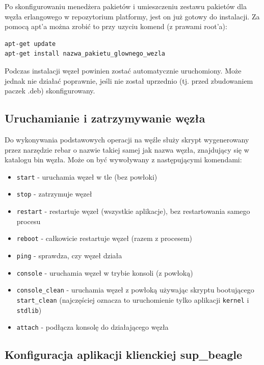 \documentclass[polish,12pt]{aghthesis}
\begin{document}
Po skonfigurowaniu menedżera pakietów i umieszczeniu zestawu pakietów dla węzła erlangowego w repozytorium platformy, jest on już gotowy do instalacji. Za pomocą apt'a można zrobić to przy uzyciu komend (z prawami root'a):

\begin{verbatim}
apt-get update
apt-get install nazwa_pakietu_glownego_wezla
\end{verbatim}
Podczas instalacji węzeł powinien zostać automatycznie uruchomiony. Może jednak nie działać poprawnie, jeśli nie został uprzednio (tj. przed zbudowaniem paczek .deb) skonfigurowany.

\subsection{Uruchamianie i zatrzymywanie węzła}

Do wykonywania podstawowych operacji na węźle służy skrypt wygenerowany przez narzędzie rebar o nazwie takiej samej jak nazwa węzła, znajdujący się w katalogu bin węzła. Może on być wywoływany z następującymi komendami:
\begin{itemize}
\item \texttt{start} - uruchamia węzeł w tle (bez powłoki)
\item \texttt{stop} - zatrzymuje węzeł
\item \texttt{restart} - restartuje węzeł (wszystkie aplikacje), bez restartowania samego procesu
\item \texttt{reboot} - całkowicie restartuje węzeł (razem z procesem)
\item \texttt{ping} - sprawdza, czy węzeł działa
\item \texttt{console} - uruchamia węzeł w trybie konsoli (z powłoką)
\item \texttt{console\_clean} - uruchamia węzeł z powłoką używając skryptu bootującego \texttt{start\_clean} (najczęściej oznacza to uruchomienie tylko aplikacji \texttt{kernel} i \texttt{stdlib})
\item \texttt{attach} - podłącza konsolę do działającego węzła
\end{itemize}
\subsection{Konfiguracja aplikacji klienckiej sup\_beagle}
\end{document}
